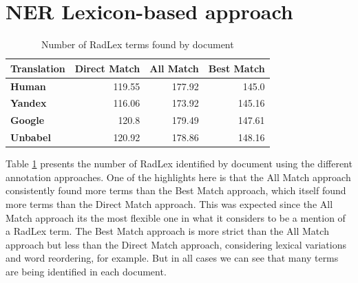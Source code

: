 \label{chap4}




\section{NER Lexicon-based approach}

\begin{table}[ht]
    \centering
    \caption{Number of RadLex terms found by document}
    \begin{tabular}{lrrr}
    \toprule
    \textbf{Translation}   &   \textbf{Direct Match} &   \textbf{All Match} &   \textbf{Best Match} \\
    \midrule
     \textbf{Human}         &         119.55 &      177.92 &       145.0 \\

     \textbf{Yandex}        &         116.06 &      173.92 &       145.16 \\

     \textbf{Google}        &         120.8 &      179.49 &       147.61 \\

     \textbf{Unbabel}       &         120.92 &      178.86 &       148.16 \\

    \bottomrule
    \end{tabular} 
    \label{table:terms_by_document}
\end{table}

Table \ref{table:terms_by_document} presents the number of RadLex identified  by document using the different annotation approaches. One of the highlights here is that the All Match approach consistently found more terms than the Best Match approach, which itself found more terms than the Direct Match approach. This was expected since the All Match approach its the most flexible one in what it considers to be a mention of a RadLex term. The Best Match approach is more strict than the All Match approach but less than the Direct Match approach, considering lexical variations and word reordering, for example. But in all cases we can see that many terms are being identified in each document.


